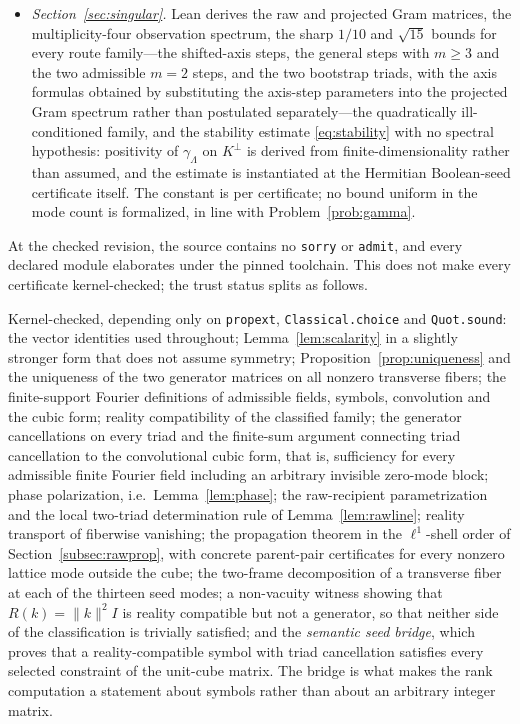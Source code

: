 \documentclass[11pt]{article}
\theoremstyle{definition}
\theoremstyle{remark}
\theoremstyle{plain}
\begin{document}
\begin{itemize}
No Sobolev completion at finite regularity is asserted.
\item \emph{Section~\ref{sec:singular}.} Lean derives the raw and projected
Gram matrices, the multiplicity-four observation spectrum, the sharp $1/10$
and $\sqrt{15}$ bounds for every route family---the shifted-axis steps, the
general steps with $m\ge3$ and the two admissible $m=2$ steps, and the two
bootstrap triads, with the axis formulas obtained by substituting the
axis-step parameters into the projected Gram spectrum rather than postulated
separately---the quadratically ill-conditioned family, and the stability
estimate \eqref{eq:stability} with no spectral hypothesis: positivity of
$\gamma_{\Lambda}$ on $K^{\perp}$ is derived from finite-dimensionality
rather than assumed, and the estimate is instantiated at the Hermitian
Boolean-seed certificate itself. The constant is per certificate; no bound
uniform in the mode count is formalized, in line with
Problem~\ref{prob:gamma}.
\end{itemize}
At the checked revision, the source contains no \texttt{sorry} or
\texttt{admit}, and every declared module elaborates under the pinned
toolchain. This does not make every certificate kernel-checked; the trust
status splits as follows.

Kernel-checked, depending only on \texttt{propext},
\texttt{Classical.choice} and \texttt{Quot.sound}: the vector identities used
throughout; Lemma~\ref{lem:scalarity} in a slightly stronger form that does not
assume symmetry; Proposition~\ref{prop:uniqueness} and the uniqueness of the
two generator matrices on all nonzero transverse fibers; the finite-support
Fourier definitions of admissible fields, symbols, convolution and the cubic
form; reality compatibility of the classified family; the generator
cancellations on every triad and the finite-sum argument connecting triad
cancellation to the convolutional cubic form, that is, sufficiency for every
admissible finite Fourier field including an arbitrary invisible zero-mode
block; phase polarization, i.e.\ Lemma~\ref{lem:phase}; the raw-recipient
parametrization and the local two-triad determination rule of
Lemma~\ref{lem:rawline}; reality transport of fiberwise vanishing; the
propagation theorem in the $\ell^{1}$-shell order of
Section~\ref{subsec:rawprop}, with concrete parent-pair certificates for every
nonzero lattice mode outside the cube; the two-frame decomposition of a
transverse fiber at each of the thirteen seed modes; a non-vacuity witness
showing that $R(k)=\|k\|^{2}I$ is reality compatible but not a generator, so
that neither side of the classification is trivially satisfied; and the
\emph{semantic seed bridge}, which proves that a reality-compatible symbol with
triad cancellation satisfies every selected constraint of the unit-cube matrix.
The bridge is what makes the rank computation a statement about symbols rather
than about an arbitrary integer matrix.
\end{document}
